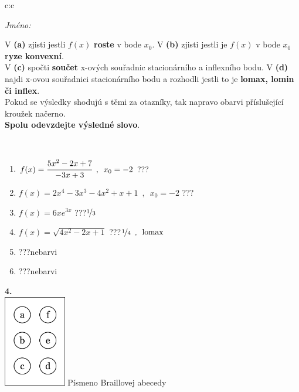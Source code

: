 \documentclass[10pt]{report}
\begin{document}
\begin{tabular}{c:c}
\begin{minipage}[c][104.5mm][t]{0.5\linewidth}
\begin{center}
\textit{Jméno:}\phantom{xxxxxxxxxxxxxxxxxxxxxxxxxxxxxxxxxxxxxxxxxxxxxxxxxxxxxxxxxxxxxxxxx}\\[5mm]
\begin{minipage}{0.95\linewidth}
\begin{center}
{\small V \textbf{(a)} zjisti jestli $f(x)$ \textbf{roste} v bode $x_0$. V \textbf{(b)} zjisti jestli je $f(x)$ v bode $x_0$ \textbf{ryze konvexní}.\\V \textbf{(c)} spočti \textbf{součet} x-ových souřadnic stacionárního a inflexního bodu. V \textbf{(d)} najdi x-ovou souřadnici stacionárního bodu a rozhodli jestli to je \textbf{lomax, lomin či inflex}.\\Pokud se výsledky shodujú s těmi za otazníky, tak napravo obarvi příslušející kroužek načerno.\\\textbf{Spolu odevzdejte výsledné slovo}}.
\end{center}
\end{minipage}
\\[1mm]
\begin{minipage}{0.79\linewidth}
\begin{center}
\begin{varwidth}{\linewidth}
\begin{enumerate}
\normalsize
\item $f(x)=\cfrac{5x^2-2x+7}{-3x+3}\enspace , \enspace x_0=-2$\quad \dotfill\; ???\;\dotfill \quad {}
\item $f(x)=2x^4-3x^3-4x^2+x+1\enspace , \enspace x_0=-2$\quad \dotfill\; ???\;\dotfill \quad {}
\item $f(x)=6xe^{3x}$\quad \dotfill\; ???\;\dotfill \quad $\nicefrac{1}{3}$
\item $f(x)=\sqrt{4x^2-2x+1}$\quad \dotfill\; ???\;\dotfill \quad $\nicefrac{1}{4}\enspace , \enspace\mathrm{lomax}$
\item \quad \dotfill\; ???\;\dotfill \quad nebarvi
\item \quad \dotfill\; ???\;\dotfill \quad nebarvi
\end{enumerate}
\end{varwidth}
\end{center}
\end{minipage}
\begin{minipage}{0.20\linewidth}
\begin{center}
{\Huge\bfseries 4.} \\[2mm]
\includegraphics[height=40mm]{../images/braille.png}
{\small Písmeno Braillovej abecedy}
\end{center}
\end{minipage}
\end{center}
\end{minipage}
%
\end{tabular}
\end{document}
